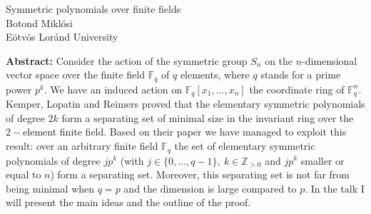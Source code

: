\documentclass[12pt,a4paper]{article}
\begin{document}
\thispagestyle{empty} 
\begin{center}
{\large  Symmetric polynomials over finite fields}\\
\vspace*{.5cm}
Botond Mikl\'osi\\
Eötvös Loránd University\\
\end{center}
\vspace*{.8cm}

{\bf Abstract:} Consider the action of the symmetric group $S_n$ on the $n$-dimensional vector space over the finite field $\mathbb{F}_q$ of $q$ elements, where $q$ stands for a prime power $p^k$. We have an induced action on $\mathbb{F}_q[x_1, \ldots, x_n]$  the coordinate ring of $\mathbb{F}_q^n$. Kemper, Lopatin and Reimers proved that the elementary symmetric polynomials of degree $2k$ form a separating set of minimal size in the invariant ring over the $2-$element finite field. Based on their paper we have managed to exploit this result: over an arbitrary finite field $\mathbb{F}_q$ the set of elementary symmetric polynomials of degree $j p^k$ (with $j \in \{ 0, \ldots, q-1\}, \ k \in \mathbb{Z}_{> 0}$ and $j p^k$ smaller or equal to $n$) form a separating set. Moreover, this separating set is not far from being minimal when $q = p$ and the dimension is large compared to $p$. In the talk I will present the main ideas and the outline of the proof.
\end{document}
